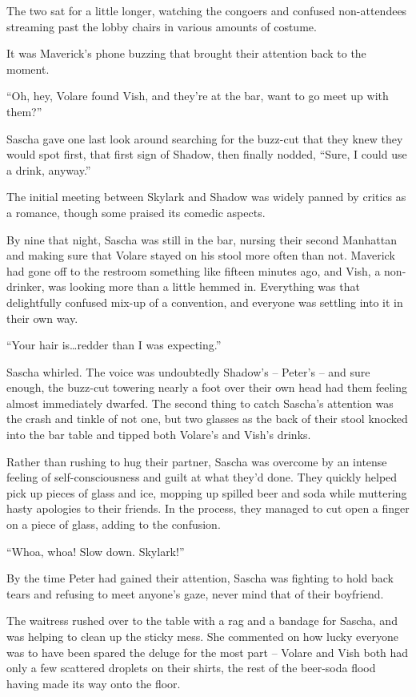 The two sat for a little longer, watching the congoers and confused non-attendees streaming past the lobby chairs in various amounts of costume.

It was Maverick's phone buzzing that brought their attention back to the moment.

``Oh, hey, Volare found Vish, and they're at the bar, want to go meet up with them?''

Sascha gave one last look around searching for the buzz-cut that they knew they would spot first, that first sign of Shadow, then finally nodded, ``Sure, I could use a drink, anyway.''

\secdiv

The initial meeting between Skylark and Shadow was widely panned by critics as a romance, though some praised its comedic aspects.

By nine that night, Sascha was still in the bar, nursing their second Manhattan and making sure that Volare stayed on his stool more often than not. Maverick had gone off to the restroom something like fifteen minutes ago, and Vish, a non-drinker, was looking more than a little hemmed in. Everything was that delightfully confused mix-up of a convention, and everyone was settling into it in their own way.

``Your hair is\ldots{}redder than I was expecting.''

Sascha whirled. The voice was undoubtedly Shadow's -- Peter's -- and sure enough, the buzz-cut towering nearly a foot over their own head had them feeling almost immediately dwarfed. The second thing to catch Sascha's attention was the crash and tinkle of not one, but two glasses as the back of their stool knocked into the bar table and tipped both Volare's and Vish's drinks.

Rather than rushing to hug their partner, Sascha was overcome by an intense feeling of self-consciousness and guilt at what they'd done. They quickly helped pick up pieces of glass and ice, mopping up spilled beer and soda while muttering hasty apologies to their friends. In the process, they managed to cut open a finger on a piece of glass, adding to the confusion.

``Whoa, whoa! Slow down. Skylark!''

By the time Peter had gained their attention, Sascha was fighting to hold back tears and refusing to meet anyone's gaze, never mind that of their boyfriend.

The waitress rushed over to the table with a rag and a bandage for Sascha, and was helping to clean up the sticky mess. She commented on how lucky everyone was to have been spared the deluge for the most part -- Volare and Vish both had only a few scattered droplets on their shirts, the rest of the beer-soda flood having made its way onto the floor.

